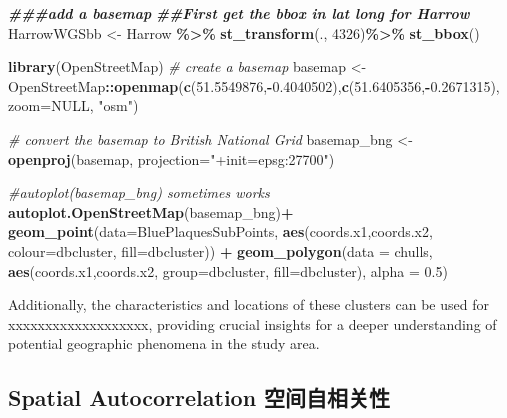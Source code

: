 \documentclass[
]{article}
\newenvironment{Shaded}{\begin{snugshade}}{\end{snugshade}}
\newcommand{\AttributeTok}[1]{\textcolor[rgb]{0.13,0.29,0.53}{#1}}
\newcommand{\CommentTok}[1]{\textcolor[rgb]{0.56,0.35,0.01}{\textit{#1}}}
\newcommand{\ConstantTok}[1]{\textcolor[rgb]{0.56,0.35,0.01}{#1}}
\newcommand{\DecValTok}[1]{\textcolor[rgb]{0.00,0.00,0.81}{#1}}
\newcommand{\DocumentationTok}[1]{\textcolor[rgb]{0.56,0.35,0.01}{\textbf{\textit{#1}}}}
\newcommand{\FloatTok}[1]{\textcolor[rgb]{0.00,0.00,0.81}{#1}}
\newcommand{\FunctionTok}[1]{\textcolor[rgb]{0.13,0.29,0.53}{\textbf{#1}}}
\newcommand{\NormalTok}[1]{#1}
\newcommand{\OtherTok}[1]{\textcolor[rgb]{0.56,0.35,0.01}{#1}}
\newcommand{\SpecialCharTok}[1]{\textcolor[rgb]{0.81,0.36,0.00}{\textbf{#1}}}
\newcommand{\StringTok}[1]{\textcolor[rgb]{0.31,0.60,0.02}{#1}}
\begin{document}
\begin{Shaded}
\begin{Highlighting}[]
\DocumentationTok{\#\#\#add a basemap}
\DocumentationTok{\#\#First get the bbox in lat long for Harrow}
\NormalTok{HarrowWGSbb }\OtherTok{\textless{}{-}}\NormalTok{ Harrow }\SpecialCharTok{\%\textgreater{}\%}
  \FunctionTok{st\_transform}\NormalTok{(., }\DecValTok{4326}\NormalTok{)}\SpecialCharTok{\%\textgreater{}\%}
  \FunctionTok{st\_bbox}\NormalTok{()}

\FunctionTok{library}\NormalTok{(OpenStreetMap)}
\CommentTok{\# create  a basemap}
\NormalTok{basemap }\OtherTok{\textless{}{-}}\NormalTok{ OpenStreetMap}\SpecialCharTok{::}\FunctionTok{openmap}\NormalTok{(}\FunctionTok{c}\NormalTok{(}\FloatTok{51.5549876}\NormalTok{,}\SpecialCharTok{{-}}\FloatTok{0.4040502}\NormalTok{),}\FunctionTok{c}\NormalTok{(}\FloatTok{51.6405356}\NormalTok{,}\SpecialCharTok{{-}}\FloatTok{0.2671315}\NormalTok{),}
                         \AttributeTok{zoom=}\ConstantTok{NULL}\NormalTok{,}
                         \StringTok{"osm"}\NormalTok{)}

\CommentTok{\# convert the basemap to British National Grid}
\NormalTok{basemap\_bng }\OtherTok{\textless{}{-}} \FunctionTok{openproj}\NormalTok{(basemap, }\AttributeTok{projection=}\StringTok{"+init=epsg:27700"}\NormalTok{)}

\CommentTok{\#autoplot(basemap\_bng) sometimes works}
\FunctionTok{autoplot.OpenStreetMap}\NormalTok{(basemap\_bng)}\SpecialCharTok{+} 
  \FunctionTok{geom\_point}\NormalTok{(}\AttributeTok{data=}\NormalTok{BluePlaquesSubPoints, }
             \FunctionTok{aes}\NormalTok{(coords.x1,coords.x2, }
                 \AttributeTok{colour=}\NormalTok{dbcluster, }
                 \AttributeTok{fill=}\NormalTok{dbcluster)) }\SpecialCharTok{+} 
  \FunctionTok{geom\_polygon}\NormalTok{(}\AttributeTok{data =}\NormalTok{ chulls, }
               \FunctionTok{aes}\NormalTok{(coords.x1,coords.x2, }
                   \AttributeTok{group=}\NormalTok{dbcluster,}
                   \AttributeTok{fill=}\NormalTok{dbcluster), }
               \AttributeTok{alpha =} \FloatTok{0.5}\NormalTok{)  }
\end{Highlighting}
\end{Shaded}

Additionally, the characteristics and locations of these clusters can be
used for xxxxxxxxxxxxxxxxxxx, providing crucial insights for a deeper
understanding of potential geographic phenomena in the study area.

\hypertarget{spatial-autocorrelation-ux7a7aux95f4ux81eaux76f8ux5173ux6027}{%
\subsection{Spatial Autocorrelation
空间自相关性}\label{spatial-autocorrelation-ux7a7aux95f4ux81eaux76f8ux5173ux6027}}
\end{document}
